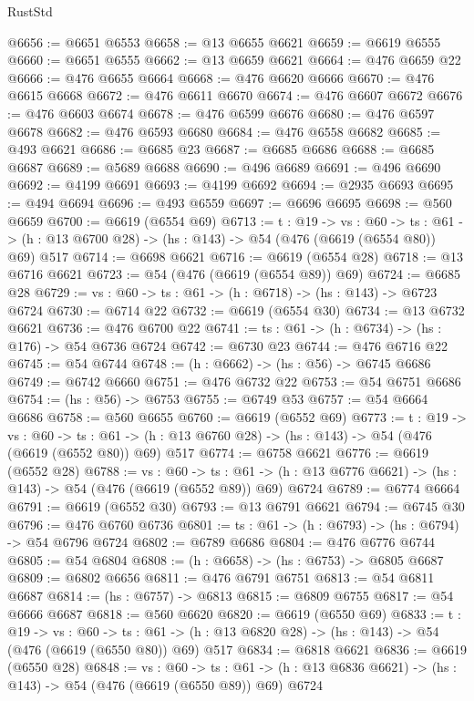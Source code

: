 \begin{lexlean}{RustStd}
\begin{coremodule}
@6656 := @6651 @6553
@6658 := @13 @6655 @6621
@6659 := @6619 @6555
@6660 := @6651 @6555
@6662 := @13 @6659 @6621
@6664 := @476 @6659 @22
@6666 := @476 @6655 @6664
@6668 := @476 @6620 @6666
@6670 := @476 @6615 @6668
@6672 := @476 @6611 @6670
@6674 := @476 @6607 @6672
@6676 := @476 @6603 @6674
@6678 := @476 @6599 @6676
@6680 := @476 @6597 @6678
@6682 := @476 @6593 @6680
@6684 := @476 @6558 @6682
@6685 := @493 @6621
@6686 := @6685 @23
@6687 := @6685 @6686
@6688 := @6685 @6687
@6689 := @5689 @6688
@6690 := @496 @6689
@6691 := @496 @6690
@6692 := @4199 @6691
@6693 := @4199 @6692
@6694 := @2935 @6693
@6695 := @494 @6694
@6696 := @493 @6559
@6697 := @6696 @6695
@6698 := @560 @6659
@6700 := @6619 (@6554 @69)
@6713 := {t : @19} ->
  {vs : @60} ->
  {ts : @61} -> (h : @13 @6700 @28) -> (hs : @143) -> @54 (@476 (@6619 (@6554 @80)) @69) @517
@6714 := @6698 @6621
@6716 := @6619 (@6554 @28)
@6718 := @13 @6716 @6621
@6723 := @54 (@476 (@6619 (@6554 @89)) @69)
@6724 := @6685 @28
@6729 := {vs : @60} -> {ts : @61} -> (h : @6718) -> (hs : @143) -> @6723 @6724
@6730 := @6714 @22
@6732 := @6619 (@6554 @30)
@6734 := @13 @6732 @6621
@6736 := @476 @6700 @22
@6741 := {ts : @61} -> (h : @6734) -> (hs : @176) -> @54 @6736 @6724
@6742 := @6730 @23
@6744 := @476 @6716 @22
@6745 := @54 @6744
@6748 := (h : @6662) -> (hs : @56) -> @6745 @6686
@6749 := @6742 @6660
@6751 := @476 @6732 @22
@6753 := @54 @6751 @6686
@6754 := (hs : @56) -> @6753
@6755 := @6749 @53
@6757 := @54 @6664 @6686
@6758 := @560 @6655
@6760 := @6619 (@6552 @69)
@6773 := {t : @19} ->
  {vs : @60} ->
  {ts : @61} -> (h : @13 @6760 @28) -> (hs : @143) -> @54 (@476 (@6619 (@6552 @80)) @69) @517
@6774 := @6758 @6621
@6776 := @6619 (@6552 @28)
@6788 := {vs : @60} ->
  {ts : @61} -> (h : @13 @6776 @6621) -> (hs : @143) -> @54 (@476 (@6619 (@6552 @89)) @69) @6724
@6789 := @6774 @6664
@6791 := @6619 (@6552 @30)
@6793 := @13 @6791 @6621
@6794 := @6745 @30
@6796 := @476 @6760 @6736
@6801 := {ts : @61} -> (h : @6793) -> (hs : @6794) -> @54 @6796 @6724
@6802 := @6789 @6686
@6804 := @476 @6776 @6744
@6805 := @54 @6804
@6808 := (h : @6658) -> (hs : @6753) -> @6805 @6687
@6809 := @6802 @6656
@6811 := @476 @6791 @6751
@6813 := @54 @6811 @6687
@6814 := (hs : @6757) -> @6813
@6815 := @6809 @6755
@6817 := @54 @6666 @6687
@6818 := @560 @6620
@6820 := @6619 (@6550 @69)
@6833 := {t : @19} ->
  {vs : @60} ->
  {ts : @61} -> (h : @13 @6820 @28) -> (hs : @143) -> @54 (@476 (@6619 (@6550 @80)) @69) @517
@6834 := @6818 @6621
@6836 := @6619 (@6550 @28)
@6848 := {vs : @60} ->
  {ts : @61} -> (h : @13 @6836 @6621) -> (hs : @143) -> @54 (@476 (@6619 (@6550 @89)) @69) @6724

\end{coremodule}
\end{lexlean}

